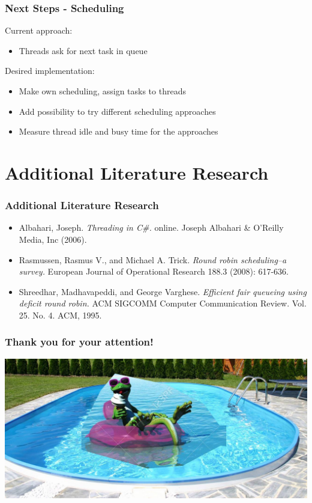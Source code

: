 \documentclass{beamer}
\begin{document}
\begin{frame}
	\frametitle{Next Steps - Scheduling}
	Current approach:  
	\begin{itemize}
		\item Threads ask for next task in queue
	\end{itemize}
	Desired implementation: 
	\begin{itemize}
		\item Make own scheduling, assign tasks to threads
		\item Add possibility to try different scheduling approaches
		\item Measure thread idle and busy time for the approaches
	\end{itemize}
\end{frame}

\section{Additional Literature Research}
    \begin{frame}
        \frametitle{Additional Literature Research}
        \begin{itemize}
            \item Albahari, Joseph. \emph{Threading in C\#.} online. Joseph Albahari \& O’Reilly Media, Inc (2006).
            \item Rasmussen, Rasmus V., and Michael A. Trick. \emph{Round robin scheduling–a survey.} European Journal of Operational Research 188.3 (2008): 617-636.
            \item Shreedhar, Madhavapeddi, and George Varghese. \emph{Efficient fair queueing using deficit round robin.} ACM SIGCOMM Computer Communication Review. Vol. 25. No. 4. ACM, 1995.
        \end{itemize}
    \end{frame}

    \begin{frame}
        \frametitle{Thank you for your attention!}
	    \includegraphics[width=\textwidth]{img/important.jpg}
    \end{frame}
\end{document}
